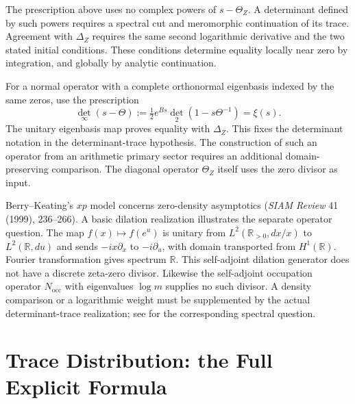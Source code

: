 The prescription above uses no complex powers of $s-\Theta_Z$.
A determinant defined by such powers requires a spectral cut and
meromorphic continuation of its trace. Agreement with $\Delta_Z$
requires the same second logarithmic derivative and the two stated
initial conditions. These conditions determine equality locally
near zero by integration, and globally by analytic continuation.

\begin{remark}
\label{v4-arith:w5-b:rem:det-does-not-buy}
For a normal operator with a complete orthonormal eigenbasis indexed
by the same zeros, use the prescription
\begin{equation}
 \det_{\infty}(s-\Theta)
 :=\tfrac12e^{Bs}\det_2(1-s\Theta^{-1})=\xi(s).
 \label{v4-arith:w5-b:eq:det-identity}
\end{equation}
The unitary eigenbasis map proves equality with $\Delta_Z$.
This fixes the determinant notation in the determinant-trace
hypothesis. The construction of such an operator from an arithmetic
primary sector requires an additional domain-preserving comparison.
The diagonal operator $\Theta_Z$ itself uses the zero divisor as input.
\end{remark}

\begin{remark}
\label{v4-arith:w5-b:rem:berry-keating-contrast}
Berry--Keating's $xp$ model concerns zero-density asymptotics
(\emph{SIAM Review} 41 (1999), 236--266). A basic dilation
realization illustrates the separate operator question. The map
$f(x)\mapsto f(e^u)$ is unitary from
$L^2(\mathbb R_{>0},dx/x)$ to $L^2(\mathbb R,du)$ and sends
$-ix\partial_x$ to $-i\partial_u$, with domain transported from
$H^1(\mathbb R)$. Fourier transformation gives spectrum $\mathbb R$.
This self-adjoint dilation generator does not have a discrete
zeta-zero divisor. Likewise the self-adjoint occupation operator
$N_{\mathrm{occ}}$ with eigenvalues $\log m$ supplies no such divisor.
A density comparison or a logarithmic weight must be supplemented
by the actual determinant-trace realization; see
 for the corresponding
spectral question.
\end{remark}

\section{Trace Distribution: the Full Explicit Formula}
\label{v4-arith:w5-b:trace}

